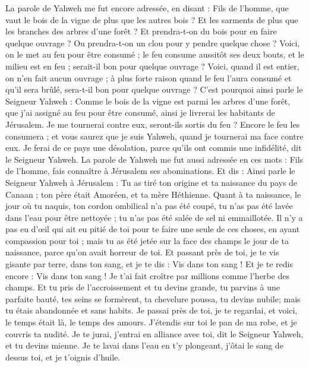 \begin{multicols}{2}
\VerseOne{}La parole de Yahweh me fut encore adressée, en disant :
Fils de l'homme, que vaut le bois de la vigne de plus que les autres bois ? Et les sarments de plus que les branches des arbres d'une forêt ?
Et prendra-t-on du bois pour en faire quelque ouvrage ? Ou prendra-t-on un clou pour y pendre quelque chose ?
Voici, on le met au feu pour être consumé ; le feu consume aussitôt ses deux bouts, et le milieu est en feu ; serait-il bon pour quelque ouvrage ?
Voici, quand il est entier, on n'en fait aucun ouvrage ; à plus forte raison quand le feu l'aura consumé et qu'il sera brûlé, sera-t-il bon pour quelque ouvrage ?
C'est pourquoi ainsi parle le Seigneur Yahweh : Comme le bois de la vigne est parmi les arbres d'une forêt, que j'ai assigné au feu pour être consumé, ainsi je livrerai les habitants de Jérusalem.
Je me tournerai contre eux, seront-ils sortis du feu ? Encore le feu les consumera ; et vous saurez que je suis Yahweh, quand je tournerai ma face contre eux.
Je ferai de ce pays une désolation, parce qu'ils ont commis une infidélité, dit le Seigneur Yahweh.
\VerseOne{}La parole de Yahweh me fut aussi adressée en ces mots :
Fils de l'homme, fais connaître à Jérusalem ses abominations.
Et dis : Ainsi parle le Seigneur Yahweh à Jérusalem : Tu as tiré ton origine et ta naissance du pays de Canaan ; ton père était Amoréen, et ta mère Héthienne.
Quant à ta naissance, le jour où tu naquis, ton cordon ombilical n'a pas été coupé, tu n'as pas été lavée dans l'eau pour être nettoyée ; tu n'as pas été salée de sel ni emmaillotée.
Il n'y a pas eu d'œil qui ait eu pitié de toi pour te faire une seule de ces choses, en ayant compassion pour toi ; mais tu as été jetée sur la face des champs le jour de ta naissance, parce qu'on avait horreur de toi.
Et passant près de toi, je te vis gisante par terre, dans ton sang, et je te dis : Vis dans ton sang ! Et je te redis encore : Vis dans ton sang !
Je t'ai fait croître par millions comme l'herbe des champs. Et tu pris de l'accroissement et tu devins grande, tu parvins à une parfaite bauté, tes seins se formèrent, ta chevelure poussa, tu devins nubile; mais tu étais abandonnée et sans habits.
Je passai près de toi, je te regardai, et voici, le temps était là, le temps des amours. J'étendis sur toi le pan de ma robe, et je couvris ta nudité. Je te jurai, j'entrai en alliance avec toi, dit le Seigneur Yahweh, et tu devins mienne.
Je te lavai dans l'eau en t'y plongeant, j'ôtai le sang de dessus toi, et je t'oignis d'huile.

\end{multicols}
